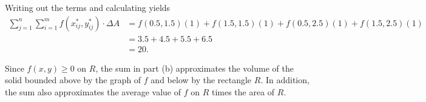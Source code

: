 \begin{activitySolution}
\begin{center}
\begin{picture}
\end{picture}
\end{center}
		
	
	
	\item Writing out the terms and calculating yields
\begin{align*}
\sum_{j=1}^n \sum_{i=1}^m f(x_{ij}^*, y_{ij}^*) \cdot \Delta A &= f(0.5, 1.5)(1) + f(1.5, 1.5)(1) + f(0.5, 2.5)(1) + f(1.5, 2.5)(1) \\
	&= 3.5+4.5+5.5+6.5 \\
	&= 20.
\end{align*}


	\item Since $f(x,y) \geq 0$ on $R$, the sum in part (b) approximates the volume of the solid bounded above by the graph of $f$ and below by the rectangle $R$. In addition, the sum also approximates the average value of $f$ on $R$ times the area of $R$. 


    \ea
\end{activitySolution}
\aftera

